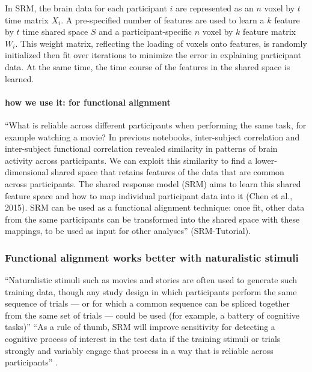 In SRM, the brain data for each participant $i$ are represented as an $n$ voxel
by $t$ time matrix  $X_{i}$. A pre-specified number of features are used to
learn a $k$ feature by  $t$ time shared space $S$ and a participant-specific $n$
voxel by $k$  feature matrix $W_{i}$. This weight matrix, reflecting the loading
of voxels onto features, is randomly initialized then fit over iterations to
minimize the error in explaining participant data. At the same time, the time
course of the features in the shared space is learned.



\paragraph{how we use it: for functional alignment}

``What is reliable across different participants when performing the same task,
for example watching a movie? In previous notebooks, inter-subject correlation
and inter-subject functional correlation revealed similarity in patterns of
brain activity across participants. We can exploit this similarity to find a
lower-dimensional shared space that retains features of the data that are common
across participants. The shared response model (SRM) aims to learn this shared
feature space and how to map individual participant data into it (Chen et al.,
2015). SRM can be used as a functional alignment technique: once fit, other data
from the same participants can be transformed into the shared space with these
mappings, to be used as input for other analyses'' (SRM-Tutorial).


\subsubsection{Functional alignment works better with naturalistic stimuli}


``Naturalistic stimuli such as movies and stories are often used to generate
such training data, though any study design in which participants perform the
same sequence of trials --- or for which a common sequence can be spliced
together from the same set of trials --- could be used (for example, a battery
of cognitive tasks)'' \citep{cohen2017computational}
%
``As a rule of thumb, SRM will improve sensitivity for detecting a cognitive
process of interest in the test data if the training stimuli or trials strongly
and variably engage that process in a way that is reliable across participants''
\citep{cohen2017computational}.


